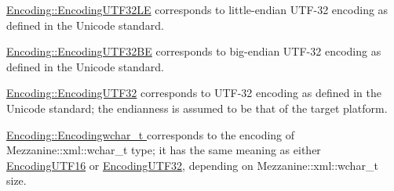 \begin{DoxyItemize}
\item \hyperlink{namespaceMezzanine_1_1xml_ab1e7e96991b9c08ac13e797a15253804}{Encoding::EncodingUTF32LE} corresponds to little-\/endian UTF-\/32 encoding as defined in the Unicode standard.
\item \hyperlink{namespaceMezzanine_1_1xml_ab1e7e96991b9c08ac13e797a15253804}{Encoding::EncodingUTF32BE} corresponds to big-\/endian UTF-\/32 encoding as defined in the Unicode standard.
\item \hyperlink{namespaceMezzanine_1_1xml_ab1e7e96991b9c08ac13e797a15253804}{Encoding::EncodingUTF32} corresponds to UTF-\/32 encoding as defined in the Unicode standard; the endianness is assumed to be that of the target platform.
\item \hyperlink{namespaceMezzanine_1_1xml_ab1e7e96991b9c08ac13e797a15253804}{Encoding::Encodingwchar\_\-t } corresponds to the encoding of Mezzanine::xml::wchar\_\-t type; it has the same meaning as either \hyperlink{namespaceMezzanine_1_1xml_ab1e7e96991b9c08ac13e797a15253804}{EncodingUTF16} or \hyperlink{namespaceMezzanine_1_1xml_ab1e7e96991b9c08ac13e797a15253804}{EncodingUTF32}, depending on Mezzanine::xml::wchar\_\-t size.
\end{DoxyItemize}

